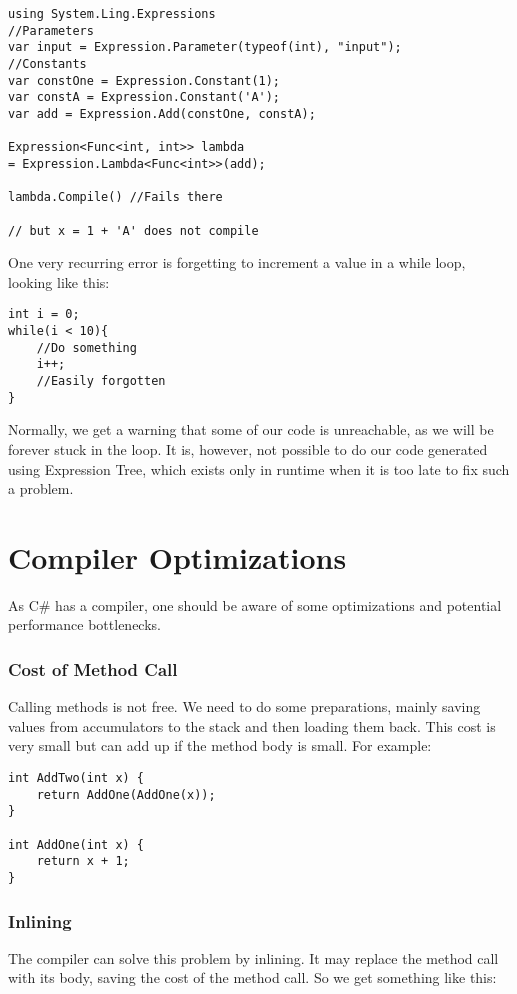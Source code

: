 \begin{lstlisting}
using System.Ling.Expressions
//Parameters
var input = Expression.Parameter(typeof(int), "input");
//Constants
var constOne = Expression.Constant(1);
var constA = Expression.Constant('A');
var add = Expression.Add(constOne, constA);

Expression<Func<int, int>> lambda 
= Expression.Lambda<Func<int>>(add);

lambda.Compile() //Fails there 

// but x = 1 + 'A' does not compile
\end{lstlisting}

One very recurring error is forgetting to increment a value in a while loop, looking like this:
\begin{lstlisting}
int i = 0;
while(i < 10){
    //Do something
    i++;
    //Easily forgotten
}
\end{lstlisting}
Normally, we get a warning that some of our code is unreachable, as we will be forever stuck in the loop. It is, however, not possible to do our code generated using Expression Tree, which exists only in runtime when it is too late to fix such a problem. 



\section{Compiler Optimizations}

As C\# has a compiler, one should be aware of some optimizations and potential performance bottlenecks.

\subsubsection{Cost of Method Call}
Calling methods is not free. We need to do some preparations, mainly saving values from accumulators to the stack and then loading them back. This cost is very small but can add up if the method body is small. For example:

\begin{lstlisting}
int AddTwo(int x) {
    return AddOne(AddOne(x));
}

int AddOne(int x) {
    return x + 1;
}
\end{lstlisting}

\subsubsection{Inlining}
The compiler can solve this problem by inlining. It may replace the method call with its body, saving the cost of the method call. So we get something like this:

